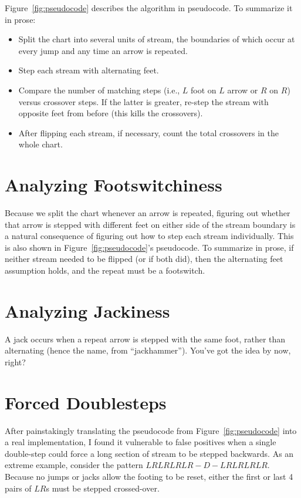\documentclass[10pt]{sigplanconf}
\begin{document}
Figure~\ref{fig:pseudocode} describes the algorithm in pseudocode.
To summarize it in prose:
\begin{itemize}
	\item Split the chart into several units of stream,
		the boundaries of which occur at every jump and any time an arrow is repeated.
	\item Step each stream with alternating feet.
	\item Compare the number of matching steps (i.e., $L$ foot on $L$ arrow or $R$ on $R$) versus crossover steps.
		If the latter is greater, re-step the stream with opposite feet from before (this kills the crossovers).
	\item After flipping each stream, if necessary, count the total crossovers in the whole chart.
\end{itemize}

\section{Analyzing Footswitchiness}

Because we split the chart whenever an arrow is repeated,
figuring out whether that arrow is stepped with different feet on either side of the stream boundary
is a natural consequence of figuring out how to step each stream individually.
This is also shown in Figure~\ref{fig:pseudocode}'s pseudocode.
To summarize in prose,
if neither stream needed to be flipped (or if both did), then the alternating feet assumption holds,
and the repeat must be a footswitch.

\section{Analyzing Jackiness}

A jack occurs when a repeat arrow is stepped with the same foot,
rather than alternating (hence the name, from ``jackhammer'').
You've got the idea by now, right?



\section{Forced Doublesteps}

After painstakingly translating the pseudocode from Figure~\ref{fig:pseudocode} into a real implementation,
I found it vulnerable to false positives when a single double-step could force a long section of stream to be stepped backwards.
As an extreme example, consider the pattern $LRLRLRLR-D-LRLRLRLR$.
Because no jumps or jacks allow the footing to be reset, either the first or last 4 pairs of $LR$s must be stepped crossed-over.
\end{document}
